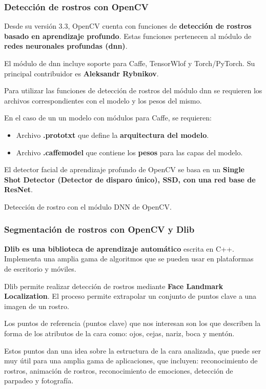 \documentclass[10pt,journal,compsoc]{IEEEtran}\usepackage[T1]{fontenc}                              %
\begin{document}
\subsubsection{Detección de rostros con OpenCV}

Desde su versión 3.3, OpenCV cuenta con funciones de \textbf{detección
de rostros basado en aprendizaje profundo}. Estas funciones pertenecen
al módulo de \textbf{redes neuronales profundas (dnn)}.

El módulo de dnn incluye soporte para Caffe, TensorWlof y Torch/PyTorch.
Su principal contribuidor es \textbf{Aleksandr Rybnikov}.

Para utilizar las funciones de detección de rostros del módulo dnn se
requieren los archivos correspondientes con el modelo y los pesos del
mismo.

En el caso de un un modelo con módulos para Caffe, se requieren:

\begin{itemize}
\item
  Archivo \textbf{.prototxt} que define la \textbf{arquitectura del
  modelo}.
\item
  Archivo \textbf{.caffemodel} que contiene los \textbf{pesos} para las
  capas del modelo.
\end{itemize}

El detector facial de aprendizaje profundo de OpenCV se basa en un
\textbf{Single Shot Detector (Detector de disparo único), SSD, con una
red base de ResNet}.

Detección de rostro con el módulo DNN de OpenCV.

\subsubsection{Segmentación de rostros con OpenCV y Dlib} 

\textbf{Dlib es una biblioteca de aprendizaje automático} escrita en
C++. Implementa una amplia gama de algoritmos que se pueden usar en
plataformas de escritorio y móviles.

Dlib permite realizar detección de rostros mediante \textbf{Face
Landmark Localization}. El proceso permite extrapolar un conjunto de
puntos clave a una imagen de un rostro.

Los puntos de referencia (puntos clave) que nos interesan son los que
describen la forma de los atributos de la cara como: ojos, cejas, nariz,
boca y mentón.

Estos puntos dan una idea sobre la estructura de la cara analizada, que
puede ser muy útil para una amplia gama de aplicaciones, que incluyen:
reconocimiento de rostros, animación de rostros, reconocimiento de
emociones, detección de parpadeo y fotografía.
\end{document}
